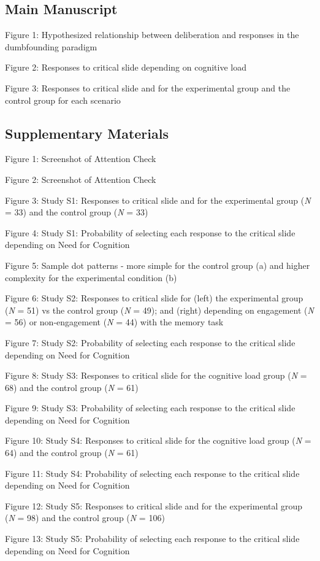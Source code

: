 \documentclass[
  american,
  man,floatsintext]{apa7}
\begin{document}
\hypertarget{main-manuscript}{%
\subsection{Main Manuscript}\label{main-manuscript}}

Figure 1: Hypothesized relationship between deliberation and responses in the dumbfounding paradigm

Figure 2: Responses to critical slide depending on cognitive load

Figure 3: Responses to critical slide and for the experimental group and the control group for each scenario

\hypertarget{supplementary-materials}{%
\subsection{Supplementary Materials}\label{supplementary-materials}}

Figure 1: Screenshot of Attention Check

Figure 2: Screenshot of Attention Check

Figure 3: Study S1: Responses to critical slide and for the experimental group (\emph{N} = 33) and the control group (\emph{N} = 33)

Figure 4: Study S1: Probability of selecting each response to the critical slide depending on Need for Cognition

Figure 5: Sample dot patterns - more simple for the control group (a) and higher complexity for the experimental condition (b)

Figure 6: Study S2: Responses to critical slide for (left) the experimental group (\emph{N} = 51) vs the control group (\emph{N} = 49); and (right) depending on engagement (\emph{N} = 56) or non-engagement (\emph{N} = 44) with the memory task

Figure 7: Study S2: Probability of selecting each response to the critical slide depending on Need for Cognition

Figure 8: Study S3: Responses to critical slide for the cognitive load group (\emph{N} = 68) and the control group (\emph{N} = 61)

Figure 9: Study S3: Probability of selecting each response to the critical slide depending on Need for Cognition

Figure 10: Study S4: Responses to critical slide for the cognitive load group (\emph{N} = 64) and the control group (\emph{N} = 61)

Figure 11: Study S4: Probability of selecting each response to the critical slide depending on Need for Cognition

Figure 12: Study S5: Responses to critical slide and for the experimental group (\emph{N} = 98) and the control group (\emph{N} = 106)

Figure 13: Study S5: Probability of selecting each response to the critical slide depending on Need for Cognition
\end{document}
